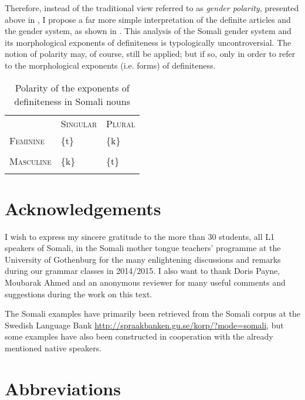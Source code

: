 \documentclass[output=paper]{langsci/langscibook}
\begin{document}
Therefore, instead of the traditional view referred to as \textit{gender polarity}, presented above in , I propose a far more simple interpretation of the definite articles and the gender system, as shown in . This analysis of the Somali gender system and its morphological exponents of definiteness is typologically uncontroversial. The notion of polarity may, of course, still be applied; but if so, only in order to refer to the morphological exponents (i.e. forms) of definiteness.


\begin{table}
\caption{Polarity of the exponents of definiteness in Somali nouns}
\label{tab:nilsson:15}

\begin{tabularx}{\textwidth}{XXX} & \textsc{Singular}& \textsc{Plural}\\
\lsptoprule
 \textsc{Feminine}& \{t\}& \{k\}\\
\hhline{--~} &  & \\
\hhline{~~-}
 \textsc{Masculine}& \{k\}& \{t\}\\
\lspbottomrule
\end{tabularx}

\end{table} 

\section*{Acknowledgements}

I wish to express my sincere gratitude to the more than 30 students, all L1 speakers of Somali, in the Somali mother tongue teachers’ programme at the University of Gothenburg for the many enlightening discussions and remarks during our grammar classes in 2014/2015. I also want to thank Doris Payne, Moubarak Ahmed and an anonymous reviewer for many useful comments and suggestions during the work on this text.

The Somali examples have primarily been retrieved from the Somali corpus at the Swedish Language Bank \url{http://spraakbanken.gu.se/korp/?mode=somali}, but some examples have also been constructed in cooperation with the already mentioned native speakers.

\section*{Abbreviations}
\end{document}
